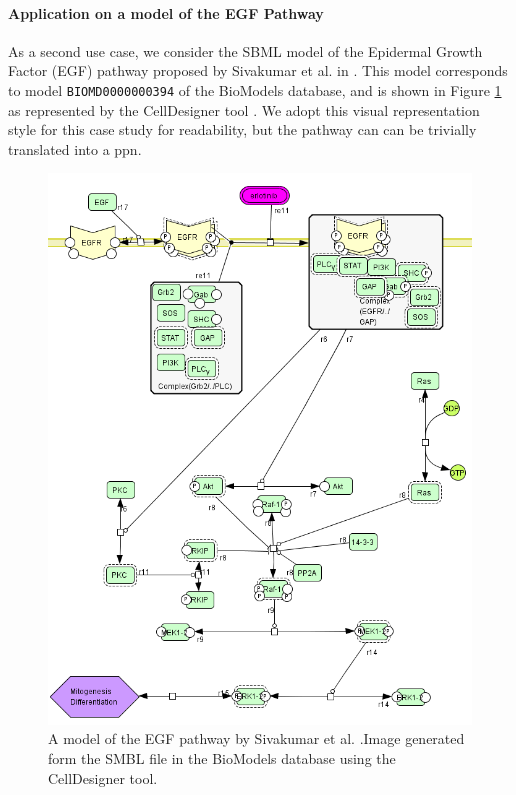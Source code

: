 \paragraph{Application on a model of the EGF Pathway}
As a second use case, we consider the SBML model of the Epidermal Growth Factor (EGF) pathway proposed by Sivakumar et al. in \citep{sivakumar2011systems}. This model corresponds to model \texttt{BIOMD0000000394} of the BioModels database, and is shown in Figure \ref{fig:EGF} as represented by the CellDesigner tool \citep{funahashi2003celldesigner}. We adopt this visual representation style for this case study for readability, but the pathway can can be trivially translated into a \gls{ppn}.
\begin{figure}[t]
    \centering
    \includegraphics[width=12cm]{Figures/Chapter5/pathway394}
\caption{A model of the EGF pathway by Sivakumar et al. \citep{sivakumar2011systems}.Image generated form the SMBL file in the BioModels database using the CellDesigner tool.}\label{fig:EGF}
\end{figure}

